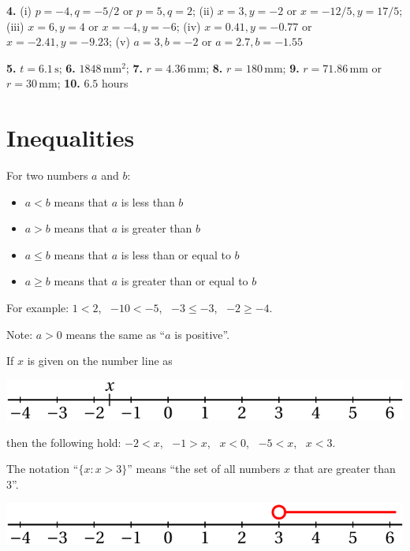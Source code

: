 \documentclass[
  12pt,
  oneside]{book}
\providecommand{\tightlist}{%
  \setlength{\itemsep}{0pt}\setlength{\parskip}{0pt}}
\theoremstyle{definition}
\theoremstyle{definition}
\theoremstyle{definition}
\theoremstyle{definition}
\theoremstyle{remark}
\begin{document}
\textbf{4.} (i) \(p=-4,q=-5/2\) or \(p=5,q=2\); (ii) \(x=3,y=-2\) or \(x=-12/5,y=17/5\); (iii) \(x=6,y=4\) or \(x=-4,y=-6\); (iv) \(x=0.41,y=-0.77\) or \(x=-2.41,y=-9.23\); (v) \(a=3,b=-2\) or \(a=2.7,b=-1.55\)

\textbf{5.} \(t=6.1\,\mathrm{s}\); \textbf{6.} \(1848\,\mathrm{mm}^2\); \textbf{7.} \(r=4.36\,\mathrm{mm}\); \textbf{8.} \(r=180\,\mathrm{mm}\); \textbf{9.} \(r=71.86\,\mathrm{mm}\) or \(r=30\,\mathrm{mm}\); \textbf{10.} \(6.5\) hours

\hypertarget{inequalities}{%
\chapter{Inequalities}\label{inequalities}}

For two numbers \(a\) and \(b\):

\begin{itemize}
\tightlist
\item
  \(a<b\) means that \(a\) is less than \(b\)
\item
  \(a>b\) means that \(a\) is greater than \(b\)
\item
  \(a\leq b\) means that \(a\) is less than or equal to \(b\)
\item
  \(a\geq b\) means that \(a\) is greater than or equal to \(b\)
\end{itemize}

For example: \(1<2\),~ \(-10<-5\),~ \(-3\leq -3\),~ \(-2\geq -4\).

Note: \(a>0\) means the same as ``\(a\) is positive''.

If \(x\) is given on the number line as

\begin{center}\includegraphics{t04-numline1} \end{center}

then the following hold: \(-2<x\),~ \(-1>x\),~ \(x<0\),~ \(-5<x\),~ \(x<3\).

The notation ``\(\{x : x>3\}\)'' means ``the set of all numbers \(x\) that are greater than \(3\)''.

\begin{center}\includegraphics{t04-numline2} \end{center}
\end{document}
